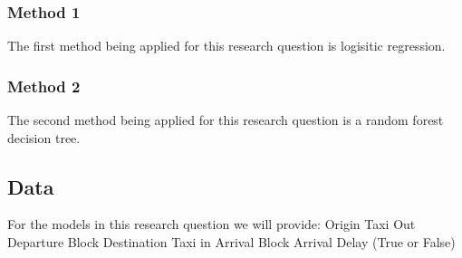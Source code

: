 \documentclass[a4paper,12pt]{article}
\begin{document}
\subsubsection{Method 1}
The first method being applied for this research question is logisitic regression.

\subsubsection{Method 2}
The second method being applied for this research question is a random forest decision tree.

\subsection{Data}
For the models in this research question we will provide:
Origin
Taxi Out
Departure Block
Destination
Taxi in
Arrival Block
Arrival Delay (True or False)
\end{document}
